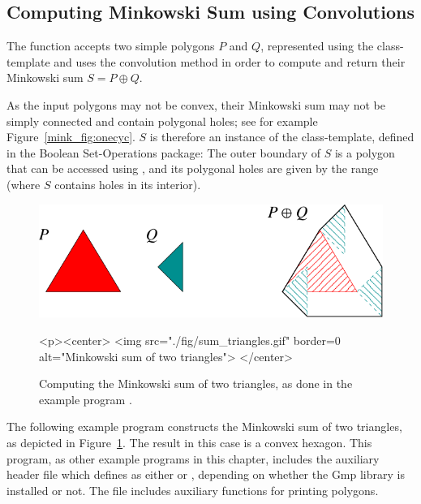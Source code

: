 \subsection{Computing Minkowski Sum using Convolutions}
\label{mink_ssec:sum_conv}

The function  accepts two simple polygons $P$
and $Q$, represented using the 
class-template and uses the convolution method in order to compute and
return their Minkowski sum $S = P \oplus Q$.

As the input polygons may not be convex, their Minkowski sum may not be
simply connected and contain polygonal holes; see for example
Figure~\ref{mink_fig:onecyc}. $S$ is therefore an instance of the
 class-template, defined in the
Boolean Set-Operations package: The outer boundary of $S$ is a polygon that
can be accessed using , and its polygonal holes 
are given by the range \ccc{[S.holes_begin(), S.holes_end())} (where $S$
contains  holes in its interior).

\begin{figure}[t]
\begin{ccTexOnly}
  \begin{center}
    \includegraphics{Minkowski_sum_2/fig/sum_triangles}
  \end{center}
\end{ccTexOnly}
\begin{ccHtmlOnly}
  <p><center>
  <img src="./fig/sum_triangles.gif" border=0 alt="Minkowski sum of two triangles">
  </center>
\end{ccHtmlOnly}
\caption{Computing the Minkowski sum of two triangles, as done
in the example program .}
\label{mink_fig:sum_tri}
\end{figure}

The following example program constructs the Minkowski sum of two triangles,
as depicted in Figure~\ref{mink_fig:sum_tri}. The result in this case is
a convex hexagon. This program, as other example programs in this chapter,
includes the auxiliary header file  which defines
 as either  or ,
depending on whether the {\sc Gmp} library is installed or not.
The file  includes auxiliary functions for printing polygons.


